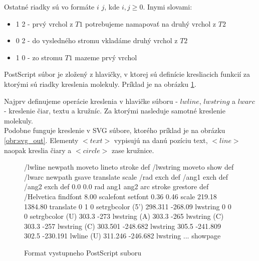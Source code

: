 Ostatné riadky sú vo formáte $i$ $j$, kde $i, j \ge 0$. Inymi slovami:
\begin{itemize}
  \item 1 2 - prvý vrchol z $T1$ potrebujeme namapovať na druhý vrchol z $T2$
  \item 0 2 - do vysledného stromu vkladáme druhý vrchol z $T2$
  \item 1 0 - zo stromu $T1$ mazeme prvý vrchol
\end{itemize}

PostScript súbor je zložený z hlavičky, v ktorej sú definície kresliacich funkcií za
ktorými sú riadky kreslenia molekuly. Príklad je na obrázku \ref{obr:ps_out}.

Najprv definujeme operácie kreslenia v hlavičke súboru - $lwline$, $lwstring$ a $lwarc$ - kreslenie čiar,
textu a kružníc. Za ktorými nasleduje samotné kreslenie molekuly. \\

Podobne funguje kreslenie v SVG súbore, ktorého príklad je na obrázku \ref{obr:svg_out}.
Elementy $<text>$ vypisujú na danú pozíciu text, $<line>$
naopak kreslia čiary a $<circle>$ zase kružnice.

\begin{figure}
\begin{code}[fontsize=\scriptsize, frame=none, samepage=true]
/lwline {newpath moveto lineto stroke} def
/lwstring {moveto show} def
/lwarc {newpath gsave translate scale /rad exch def /ang1 exch def /ang2 exch def 0.0 0.0
  rad ang1 ang2 arc stroke grestore} def
/Helvetica findfont 8.00 scalefont setfont
0.36 0.46 scale
219.18 1384.80 translate
0              1              0               setrgbcolor
(5')            298.311        -268.09         lwstring
0              0              0               setrgbcolor
(U)             303.3          -273            lwstring
(A)             303.3          -265            lwstring
(C)             303.3          -257            lwstring
(C)             303.501        -248.682        lwstring
305.5          -241.809       302.5          -230.191        lwline
(U)             311.246        -246.682        lwstring
  ...
showpage
\end{code}
\caption{Format vystupneho PostScript suboru}
\label{obr:ps_out}
\end{figure}

